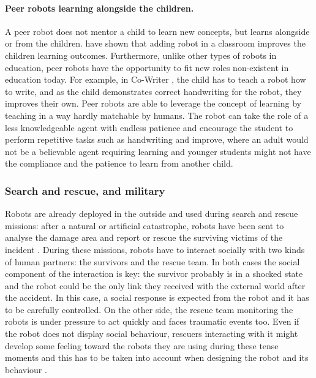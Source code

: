 	\paragraph{Peer robots learning alongside the children.}
	A peer robot does not mentor a child to learn new concepts, but learns alongside or from the children. \cite{kanda2004interactive} have shown that adding robot in a classroom improves the children learning outcomes. Furthermore, unlike other types of robots in education, peer robots have the opportunity to fit new roles non-existent in education today. For example, in Co-Writer \citep{hood2015children}, the child has to teach a robot how to write, and as the child demonstrates correct handwriting for the robot, they improves their own. Peer robots are able to leverage the concept of learning by teaching \citep{frager1970learning} in a way hardly matchable by humans. The robot can take the role of a less knowledgeable agent with endless patience and encourage the student to perform repetitive tasks such as handwriting and improve, where an adult would not be a believable agent requiring learning and younger students might not have the compliance and the patience to learn from another child.
	
\subsubsection{Search and rescue, and military} 
	
    Robots are already deployed in the outside and used during search and rescue missions: after a natural or artificial catastrophe, robots have been sent to analyse the damage area and report or rescue the surviving victims of the incident \citep{murphy2008search}. During these missions, robots have to interact socially with two kinds of human partners: the survivors and the rescue team. In both cases the social component of the interaction is key: the survivor probably is in a shocked state and the robot could be the only link they received with the external world after the accident. In this case, a social response is expected from the robot and it has to be carefully controlled. On the other side, the rescue team monitoring the robots is under pressure to act quickly and faces traumatic events too. Even if the robot does not display social behaviour, rescuers interacting with it might develop some feeling toward the robots they are using during these tense moments and this has to be taken into account when designing the robot and its behaviour \citep{fincannon2004evidence}.
	
